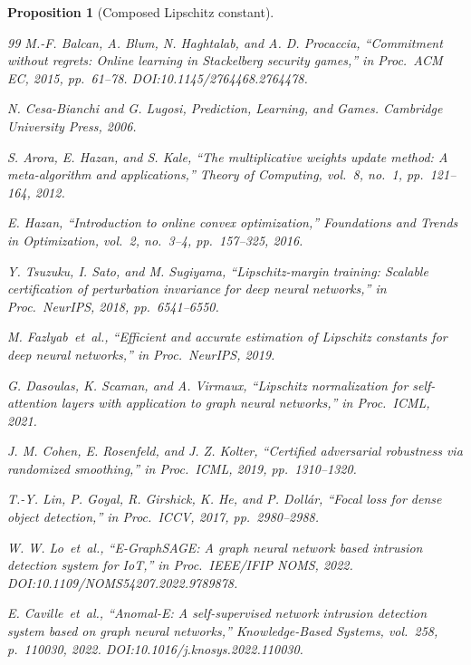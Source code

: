 \documentclass{ieeeaccess}
\newtheorem{proposition}[theorem]{Proposition}
\begin{document}
\begin{proposition}[Composed Lipschitz constant]
\begin{thebibliography}{99}
 M.-F. Balcan, A. Blum, N. Haghtalab, and A. D. Procaccia, ``Commitment without regrets: Online learning in Stackelberg security games,'' in \textit{Proc.\ ACM EC}, 2015, pp.~61--78. DOI:10.1145/2764468.2764478.

 N. Cesa-Bianchi and G. Lugosi, \textit{Prediction, Learning, and Games}. Cambridge University Press, 2006.

 S. Arora, E. Hazan, and S. Kale, ``The multiplicative weights update method: A meta-algorithm and applications,'' \textit{Theory of Computing}, vol.~8, no.~1, pp.~121--164, 2012.

 E. Hazan, ``Introduction to online convex optimization,'' \textit{Foundations and Trends in Optimization}, vol.~2, no.~3--4, pp.~157--325, 2016.

 Y. Tsuzuku, I. Sato, and M. Sugiyama, ``Lipschitz-margin training: Scalable certification of perturbation invariance for deep neural networks,'' in \textit{Proc.\ NeurIPS}, 2018, pp.~6541--6550.

 M. Fazlyab~\textit{et~al.}, ``Efficient and accurate estimation of Lipschitz constants for deep neural networks,'' in \textit{Proc.\ NeurIPS}, 2019.

 G. Dasoulas, K. Scaman, and A. Virmaux, ``Lipschitz normalization for self-attention layers with application to graph neural networks,'' in \textit{Proc.\ ICML}, 2021.

 J. M. Cohen, E. Rosenfeld, and J. Z. Kolter, ``Certified adversarial robustness via randomized smoothing,'' in \textit{Proc.\ ICML}, 2019, pp.~1310--1320.

 T.-Y. Lin, P. Goyal, R. Girshick, K. He, and P. Doll\'ar, ``Focal loss for dense object detection,'' in \textit{Proc.\ ICCV}, 2017, pp.~2980--2988.

 W. W. Lo~\textit{et~al.}, ``E-GraphSAGE: A graph neural network based intrusion detection system for IoT,'' in \textit{Proc.\ IEEE/IFIP NOMS}, 2022. DOI:10.1109/NOMS54207.2022.9789878.

 E. Caville~\textit{et~al.}, ``Anomal-E: A self-supervised network intrusion detection system based on graph neural networks,'' \textit{Knowledge-Based Systems}, vol.~258, p.~110030, 2022. DOI:10.1016/j.knosys.2022.110030.


\end{thebibliography}
\end{proposition}
\end{document}
